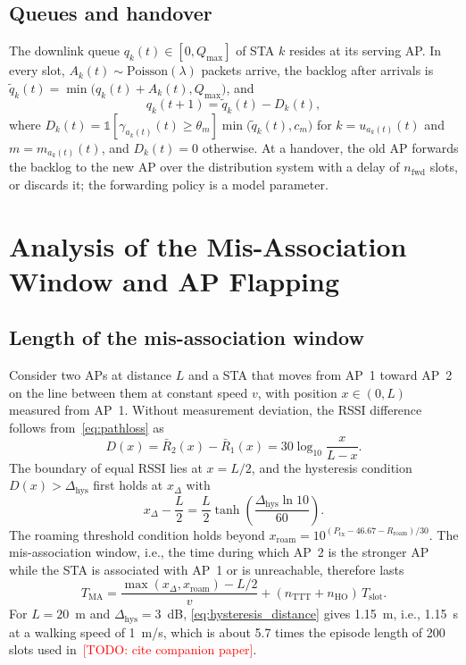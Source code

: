 \documentclass{ieeeaccess}
\newcommand{\todo}[1]{\textcolor{red}{[TODO: #1]}}
\begin{document}
\subsection{Queues and handover}
The downlink queue $q_k(t) \in [0, Q_{\max}]$ of STA $k$ resides at its serving AP. In every slot, $A_k(t) \sim \text{Poisson}(\lambda)$ packets arrive, the backlog after arrivals is $\tilde{q}_k(t) = \min\bigl(q_k(t) + A_k(t), Q_{\max}\bigr)$, and
\begin{equation}
q_k(t+1) = \tilde{q}_k(t) - D_k(t),
\label{eq:queue}
\end{equation}
where $D_k(t) = \mathbb{1}[\gamma_{a_k(t)}(t) \ge \theta_{m}]\min\bigl(\tilde{q}_k(t), c_{m}\bigr)$ for $k = u_{a_k(t)}(t)$ and $m = m_{a_k(t)}(t)$, and $D_k(t) = 0$ otherwise. At a handover, the old AP forwards the backlog to the new AP over the distribution system with a delay of $n_{\text{fwd}}$ slots, or discards it; the forwarding policy is a model parameter.

\section{Analysis of the Mis-Association Window and AP Flapping}
\label{sec:analysis}
\subsection{Length of the mis-association window}
Consider two APs at distance $L$ and a STA that moves from AP~1 toward AP~2 on the line between them at constant speed $v$, with position $x \in (0, L)$ measured from AP~1. Without measurement deviation, the RSSI difference follows from~\eqref{eq:pathloss} as
\begin{equation}
D(x) = \bar{R}_{2}(x) - \bar{R}_{1}(x) = 30 \log_{10}\frac{x}{L - x}.
\label{eq:rssi_difference}
\end{equation}
The boundary of equal RSSI lies at $x = L/2$, and the hysteresis condition $D(x) > \Delta_{\text{hys}}$ first holds at $x_{\Delta}$ with
\begin{equation}
x_{\Delta} - \frac{L}{2} = \frac{L}{2}\tanh\!\left(\frac{\Delta_{\text{hys}} \ln 10}{60}\right).
\label{eq:hysteresis_distance}
\end{equation}
The roaming threshold condition holds beyond $x_{\text{roam}} = 10^{(P_{\text{tx}} - 46.67 - R_{\text{roam}})/30}$. The mis-association window, i.e., the time during which AP~2 is the stronger AP while the STA is associated with AP~1 or is unreachable, therefore lasts
\begin{equation}
T_{\text{MA}} = \frac{\max(x_{\Delta}, x_{\text{roam}}) - L/2}{v} + (n_{\text{TTT}} + n_{\text{HO}})\,T_{\text{slot}}.
\label{eq:window}
\end{equation}
For $L = 20$~m and $\Delta_{\text{hys}} = 3$~dB, \eqref{eq:hysteresis_distance} gives 1.15~m, i.e., 1.15~s at a walking speed of 1~m/s, which is about 5.7 times the episode length of 200 slots used in~\todo{cite companion paper}.
\end{document}
